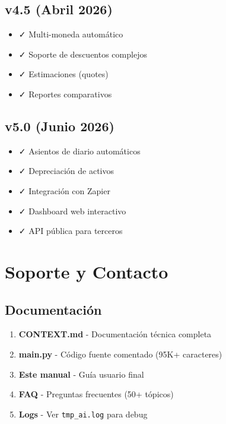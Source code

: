 \documentclass[12pt,oneside]{article}
\begin{document}
\subsection{v4.5 (Abril 2026)}

\begin{itemize}
    \item ✓ Multi-moneda automático
    \item ✓ Soporte de descuentos complejos
    \item ✓ Estimaciones (quotes)
    \item ✓ Reportes comparativos
\end{itemize}

\subsection{v5.0 (Junio 2026)}

\begin{itemize}
    \item ✓ Asientos de diario automáticos
    \item ✓ Depreciación de activos
    \item ✓ Integración con Zapier
    \item ✓ Dashboard web interactivo
    \item ✓ API pública para terceros
\end{itemize}

\newpage

\section{Soporte y Contacto}

\subsection{Documentación}

\begin{enumerate}
    \item \textbf{CONTEXT.md} - Documentación técnica completa
    \item \textbf{main.py} - Código fuente comentado (95K+ caracteres)
    \item \textbf{Este manual} - Guía usuario final
    \item \textbf{FAQ} - Preguntas frecuentes (50+ tópicos)
    \item \textbf{Logs} - Ver \texttt{tmp\_ai.log} para debug
\end{enumerate}
\end{document}
